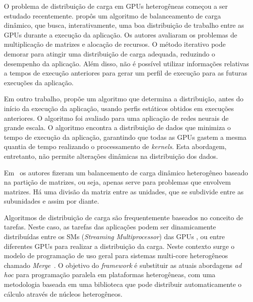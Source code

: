 O problema de distribuição de carga em GPUs heterogêneas começou a ser estudado
recentemente. \cite{acosta} propôs um algoritmo de balanceamento de carga
dinâmico, que busca, interativamente, uma boa distribuição de trabalho entre as
GPUs durante a execução da aplicação. Os autores avaliaram os problemas de
multiplicação de matrizes e alocação de recursos. O método iterativo pode
demorar para atingir uma distribuição de carga adequada, reduzindo o desempenho
da aplicação. Além disso, não é possível utilizar informações relativas a tempos
de execução anteriores para gerar um perfil de execução para as futuras
execuções da aplicação.

Em outro trabalho, \cite{raphael} propõe um algoritmo que determina a
distribuição, antes do início da execução da aplicação, usando perfis estáticos
obtidos em execuções anteriores. O algoritmo foi avaliado para uma aplicação de
redes neurais de grande escala. O algoritmo encontra a distribuição de dados que
minimiza o tempo de execução da aplicação, garantindo que todas as GPUs gastem a
mesma quantia de tempo realizando o processamento de \emph{kernels}. Esta
abordagem, entretanto, não permite alterações dinâmicas na distribuição dos
dados.

Em~\cite{Clarke:2012:HPA:2402420.2402479}  os autores fizeram um balancemento de carga dinâmico heterogêneo baseado na partição de matrizes, ou seja, apenas serve para problemas que envolvem matrizes. Há uma divisão da matriz entre as unidades, que se subdivide entre as subunidades e assim por diante. 


Algoritmos de distribuição de carga são frequentemente baseados no conceito de
tarefas. Neste caso, as tarefas das aplicações podem ser dinamicamente
distribuídas entre os SMs (\textit{Streaming Multiprocessor}) das GPUs
\cite{dynamicLoad}, ou entre diferentes GPUs \cite{starpu} para realizar a
distribuição da carga. Neste contexto surge o modelo de programação de uso geral
para sistemas multi-core heterogêneos chamado \textit{Merge}~\cite{merge}. O
objetivo do \textit{framework} é substituir as atuais abordagens \textit{ad hoc}
para programação paralela em plataformas heterogêneas, com uma metodologia
baseada em uma biblioteca que pode distribuir automaticamente o cálculo através
de núcleos heterogêneos.

